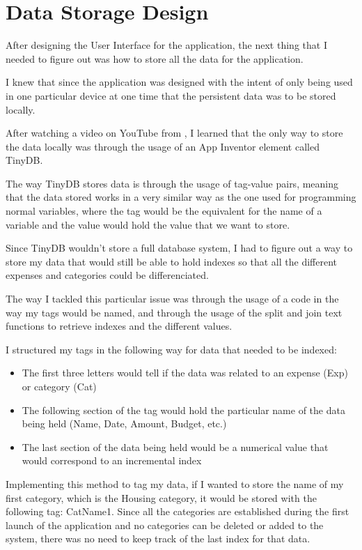 \chapter{Data Storage Design}
After designing the User Interface for the application, the next thing that I needed to figure out was how to store all the data for the application.

I knew that since the application was designed with the intent of only being used in one particular device at one time that the persistent data was to be stored locally.

After watching a video on YouTube from \cite{tinyDBTuto}, I learned that the only way to store the data locally was through the usage of an App Inventor element called TinyDB.

The way TinyDB stores data is through the usage of tag-value pairs, meaning that the data stored works in a very similar way as the one used for programming normal variables, where the tag would be the equivalent for the name of a variable and the value would hold the value that we want to store.

Since TinyDB wouldn't store a full database system, I had to figure out a way to store my data that would still be able to hold indexes so that all the different expenses and categories could be differenciated.

The way I tackled this particular issue was through the usage of a code in the way my tags would be named, and through the usage of the split and join text functions to retrieve indexes and the different values.

I structured my tags in the following way for data that needed to be indexed:
\begin{itemize}
  \item The first three letters would tell if the data was related to an expense (Exp) or category (Cat)
  \item The following section of the tag would hold the particular name of the data being held (Name, Date, Amount, Budget, etc.)
  \item The last section of the data being held would be a numerical value that would correspond to an incremental index
\end{itemize}

Implementing this method to tag my data, if I wanted to store the name of my first category, which is the Housing category, it would be stored with the following tag: CatName1. Since all the categories are established during the first launch of the application and no categories can be deleted or added to the system, there was no need to keep track of the last index for that data.


